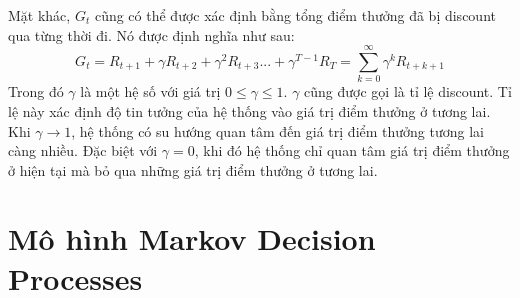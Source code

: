 Mặt khác, $\mathit{G_t}$ cũng có thể được xác định bằng tổng điểm thưởng đã bị discount qua từng thời đi. Nó được định nghĩa như sau:
\begin{equation}
\mathit{G_t} = \mathit{R_{t+1}} + \gamma\mathit{R_{t+2}} + \gamma^{2}\mathit{R_{t+3}}... + \gamma^{T-1}\mathit{R_{T}} = \sum_{k=0}^{\infty}\gamma^{k}\mathit{R_{t+k+1}}
\end{equation}
Trong đó $\gamma$ là một hệ số với giá trị $0\leqslant \gamma \leqslant 1$. $\gamma$ cũng được gọi là tỉ lệ discount. Tỉ lệ này xác định độ tin tưởng của hệ thống vào giá trị điểm thưởng ở tương lai. Khi $\gamma \to 1$, hệ thống có su hướng quan tâm đến giá trị điểm thưởng tương lai càng nhiều. Đặc biệt với $\gamma = 0$, khi đó hệ thống chỉ quan tâm giá trị điểm thưởng ở hiện tại mà bỏ qua những giá trị điểm thưởng ở tương lai.

\section{Mô hình Markov Decision Processes}
